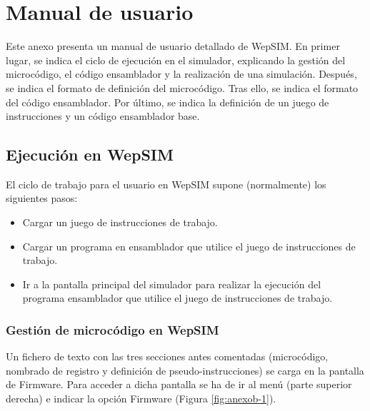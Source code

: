 \chead[]{}
\renewcommand{\headrulewidth}{0.5pt}

\lfoot[]{}
\cfoot[]{}
\rfoot[]{}
\renewcommand{\footrulewidth}{0pt}




\chapter{Manual de usuario}
\label{ch:apendiceb}


Este anexo presenta un manual de usuario detallado de WepSIM. En primer lugar, se indica el ciclo de ejecución en el simulador, explicando la gestión del microcódigo, el código ensamblador y la realización de una simulación. Después, se indica el formato de definición del microcódigo. Tras ello, se indica el formato del código ensamblador. Por último, se indica la definición de un juego de instrucciones y un código ensamblador base.

\section*{Ejecución en WepSIM}

El ciclo de trabajo para el usuario en WepSIM supone (normalmente) los siguientes pasos:

\begin{itemize}

\item Cargar un juego de instrucciones de trabajo.

\item Cargar un programa en ensamblador que utilice el juego de instrucciones de trabajo.

\item Ir a la pantalla principal del simulador para realizar la ejecución del programa ensamblador que utilice el juego de instrucciones de trabajo.

\end{itemize}

\subsection*{Gestión de microcódigo en WepSIM}
\label{ch:anexob_microcodigo}

Un fichero de texto con las tres secciones antes comentadas (microcódigo, nombrado de registro y definición de pseudo-instrucciones) se carga en la pantalla de Firmware. Para acceder a dicha pantalla se ha de ir al menú (parte superior derecha) e indicar la opción Firmware (Figura \ref{fig:anexob-1}).

